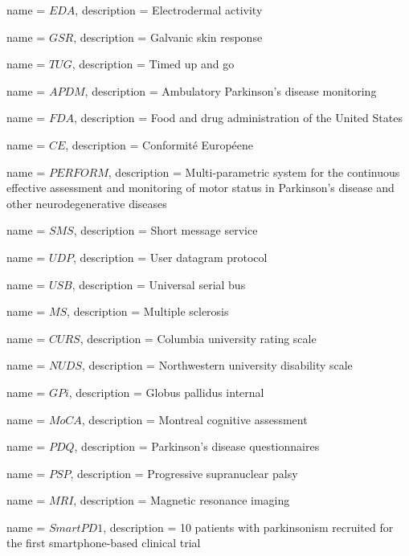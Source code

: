 {
	name = $EDA$, 
	description = Electrodermal activity
}

{
	name = $GSR$, 
	description = Galvanic skin response
}

{
	name = $TUG$, 
	description = Timed up and go
}

{
	name = $APDM$, 
	description = Ambulatory Parkinson's disease monitoring
}

{
	name = $FDA$, 
	description = Food and drug administration of the United States
}

{
	name = $CE$, 
	description = Conformité Européene
}

{
	name = $PERFORM$, 
	description = Multi-parametric system for the continuous effective assessment and monitoring of motor status in Parkinson's disease and other neurodegenerative diseases
}

{
	name = $SMS$, 
	description = Short message service
}

{
	name = $UDP$, 
	description = User datagram protocol
}

{
	name = $USB$, 
	description = Universal serial bus
}

{
	name = $MS$, 
	description = Multiple sclerosis
}

{
	name = $CURS$, 
	description = Columbia university rating scale
}

{
	name = $NUDS$, 
	description = Northwestern university disability scale
}

{
	name = $GPi$, 
	description = Globus pallidus internal
}

{
	name = $MoCA$, 
	description = Montreal cognitive assessment
}

{
	name = $PDQ$, 
	description = Parkinson's disease questionnaires
}

{
	name = $PSP$, 
	description = Progressive supranuclear palsy
}

{
	name = $MRI$, 
	description = Magnetic resonance imaging
}

{
	name = $SmartPD1$, 
	description = 10 patients with parkinsonism recruited for the first smartphone-based clinical trial
}

